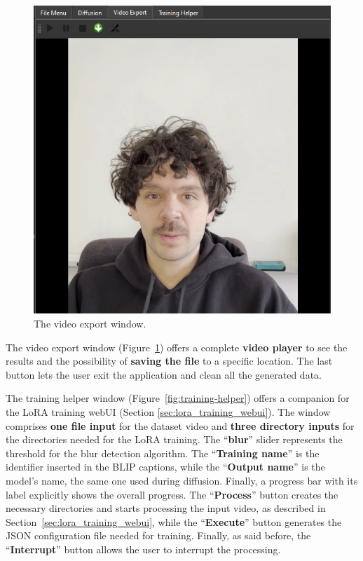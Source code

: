 \documentclass[sn-mathphys,Numbered]{sn-jnl}
\theoremstyle{thmstyleone}%
\theoremstyle{thmstyletwo}%
\theoremstyle{thmstylethree}%
\begin{document}
\begin{figure}[t]
	\centering
	\includegraphics[scale=0.45, keepaspectratio]{img/project_img/video-window.png}
	\caption{The video export window.}
	\label{fig:video-player}
\end{figure}

The video export window (Figure~\ref{fig:video-player}) offers a complete \textbf{video player} 
to see the results and the possibility of \textbf{saving the file} to a specific location. 
The last button lets the user exit the application and clean all the generated data.


The training helper window (Figure~\ref{fig:training-helper}) offers a companion for the LoRA training webUI (Section \ref{sec:lora_training_webui}). The window comprises \textbf{one file input} for the dataset video and \textbf{three directory inputs}  for the directories needed for the LoRA training. The ``\textbf{blur}'' slider represents the threshold for the blur detection algorithm. The ``\textbf{Training name}'' is the identifier inserted in the BLIP captions, while the ``\textbf{Output name}'' is the model's name, the same one used during diffusion. Finally, a progress bar with its label explicitly shows the overall progress. The ``\textbf{Process}'' button creates the necessary directories and starts processing the input video, as described in Section~\ref{sec:lora_training_webui}, while the ``\textbf{Execute}'' button generates the  JSON configuration file needed for training. Finally, as said before, the ``\textbf{Interrupt}'' button allows the user to interrupt the processing.
\end{document}
